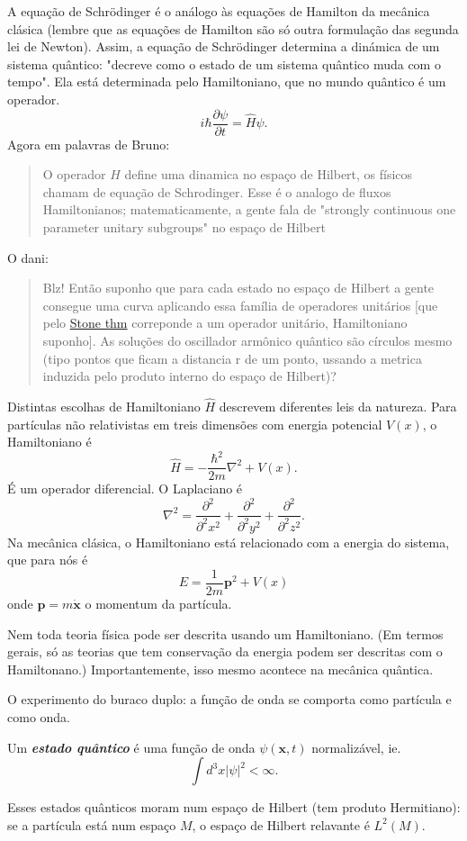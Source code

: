 A equação de Schrödinger é o análogo às equações de Hamilton da mecânica clásica (lembre que as equações de Hamilton são só outra formulação das segunda lei de Newton). Assim, a equação de Schrödinger determina a dinámica de um sistema quântico: "decreve como o estado de um sistema quântico muda com o tempo". Ela está determinada pelo Hamiltoniano, que no mundo quântico é um operador.
 \[i\hbar \frac{\partial \psi}{\partial t}=\hat{H}\psi.\]
 Agora em palavras de Bruno:
 {\color{3}\begin{quotation}
 	O operador $H$ define uma dinamica no espaço de Hilbert, os físicos chamam de equação de Schrodinger. Esse é o analogo de fluxos Hamiltonianos; matematicamente, a gente fala de "strongly continuous one parameter unitary subgroups" no espaço de Hilbert
 \end{quotation}}
 O dani:
 {\color{5}\begin{quotation}
		 Blz! Então suponho que para cada estado no espaço de Hilbert a gente consegue uma curva aplicando essa família de operadores unitários [que pelo \href{https://en.wikipedia.org/wiki/Stone%27s_theorem_on_one-parameter_unitary_groups}{Stone thm} correponde  a um operador unitário, Hamiltoniano suponho]. As soluções do oscillador armônico quântico são círculos mesmo (tipo pontos que ficam a distancia r de um ponto, ussando a metrica induzida pelo produto interno do espaço de Hilbert)?
 \end{quotation}}
 Distintas escolhas de Hamiltoniano $\hat{H}$ descrevem diferentes leis da natureza. Para partículas não relativistas em treis dimensões com energia potencial $V(x)$, o Hamiltoniano  é
 \[\hat{H}=-\frac{\hbar^2}{2m}\nabla^2+V(x).\]
 \'E um operador diferencial. O Laplaciano \'e
 \[\nabla^2=\frac{\partial^2}{\partial^2 x^2}+\frac{\partial^2}{\partial^2 y^2}+\frac{\partial^2}{\partial^2z^2}.\]
 Na mec\^anica cl\'asica, o Hamiltoniano est\'a relacionado com a energia do sistema, que para n\'os \'e
 \[E=\frac{1}{2m}\mathbf{p}^2+V(x)\]
 onde $\mathbf{p}=m\dot{\mathbf{x}}$ o momentum da partícula.

 Nem toda teoria f\'isica pode ser descrita usando um Hamiltoniano. (Em termos gerais, s\'o as teorias que tem conserva\c c\~ao da energia podem ser descritas com o Hamiltonano.) Importantemente, isso mesmo acontece na mecânica quântica.

 O experimento do buraco duplo: a função de onda se comporta como part\'icula e como onda.

 \begin{defn}
 	Um \textit{\textbf{estado quântico}} é uma função de onda $\psi(\mathbf{x},t)$ normalizável, ie.
	\[\int d^3x|\psi|^2<\infty.\]
 \end{defn}
 Esses estados qu\^anticos moram num espaço de Hilbert (tem produto Hermitiano): se a part\'icula est\'a num espaço $M$, o espaço de Hilbert relavante \'e $L^2(M)$.

